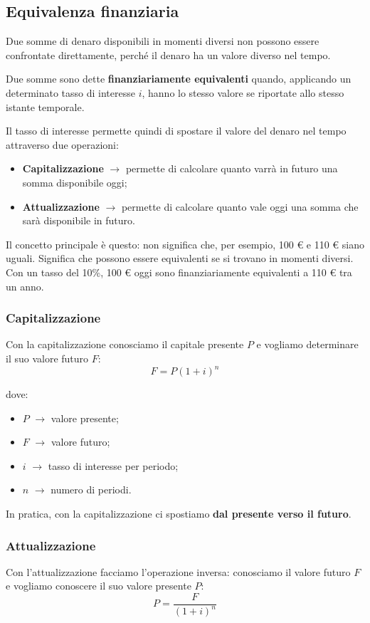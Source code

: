 \subsection{Equivalenza finanziaria}
Due somme di denaro disponibili in momenti diversi non possono essere confrontate 
direttamente, perché il denaro ha un valore diverso nel tempo.

\noindent Due somme sono dette \textbf{finanziariamente equivalenti} quando, applicando un determinato tasso di 
interesse \(i\), hanno lo stesso valore se riportate allo stesso istante temporale.

\noindent Il tasso di interesse permette quindi di spostare il valore del denaro nel tempo attraverso due operazioni:
\begin{itemize}
    \item \textbf{Capitalizzazione} $\rightarrow$ permette di calcolare quanto varrà in futuro una somma disponibile oggi;
    \item \textbf{Attualizzazione} $\rightarrow$ permette di calcolare quanto vale oggi una somma che sarà disponibile in futuro.
\end{itemize}
Il concetto principale è questo: non significa che, per esempio, 100 € e 110 € 
siano uguali. Significa che possono essere equivalenti se si trovano in momenti diversi. Con un tasso del 10\%, 
100 € oggi sono finanziariamente equivalenti a 110 € tra un anno.
\subsubsection*{Capitalizzazione}
Con la capitalizzazione conosciamo il capitale presente \(P\) e vogliamo determinare il suo valore futuro \(F\):
\[
F = P(1+i)^n
\]

\noindent dove:
\begin{itemize}
    \item \(P\) $\rightarrow$ valore presente;
    \item \(F\) $\rightarrow$ valore futuro;
    \item \(i\) $\rightarrow$ tasso di interesse per periodo;
    \item \(n\) $\rightarrow$ numero di periodi.
\end{itemize}

\noindent In pratica, con la capitalizzazione ci spostiamo \textbf{dal presente verso il futuro}.

\subsubsection*{Attualizzazione}
Con l'attualizzazione facciamo l'operazione inversa: conosciamo il valore futuro \(F\) e vogliamo conoscere il suo valore presente \(P\):
\[
P = \frac{F}{(1+i)^n}
\]


